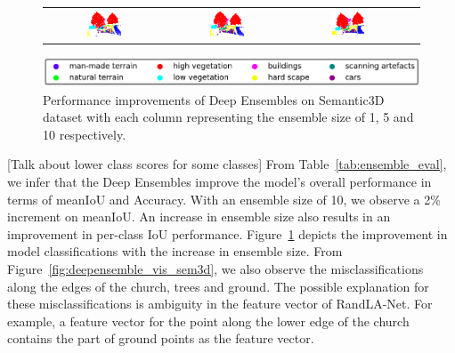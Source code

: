 \begin{figure}[h!]
\begin{tabular}{cccc}
            \includegraphics[width=0.30\textwidth, height=0.15\textheight]{images/seg_output/deep_ensembles/2_1.pdf} &
            \includegraphics[width=0.30\textwidth, height=0.15\textheight]{images/seg_output/deep_ensembles/2_5.pdf}& 
            \includegraphics[width=0.30\textwidth, height=0.15\textheight]{images/seg_output/deep_ensembles/2_10.pdf}\\
        \end{tabular}
        \includegraphics[scale=0.45]{images/legend.png}
        \caption{Performance improvements of Deep Ensembles on Semantic3D dataset with each column representing the ensemble size of 1, 5 and 10 respectively.}
        \label{fig:deepensemble_improv}
    \end{figure}

    [Talk about lower class scores for some classes]
    From Table~\ref{tab:ensemble_eval}, we infer that the Deep Ensembles improve the model's overall performance in terms of meanIoU and Accuracy.
    With an ensemble size of 10, we observe a 2\% increment on meanIoU.
    An increase in ensemble size also results in an improvement in per-class IoU performance.
    Figure~\ref{fig:deepensemble_improv} depicts the improvement in model classifications with the increase in ensemble size.
    From Figure~\ref{fig:deepensemble_vis_sem3d}, we also observe the misclassifications along the edges of the church, trees and ground.
    The possible explanation for these misclassifications is ambiguity in the feature vector of RandLA-Net. For example, a feature vector for the point along the lower edge of the church contains the part of ground points as the feature vector.
